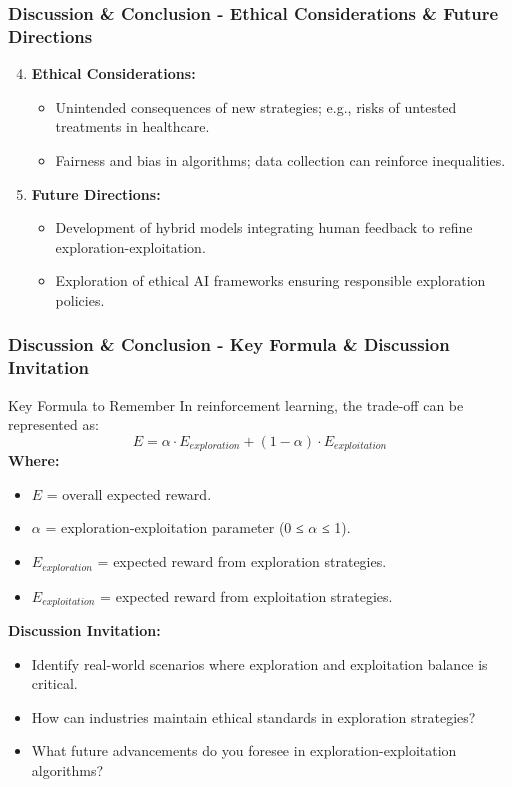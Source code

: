\documentclass[aspectratio=169]{beamer}
\begin{document}
\begin{frame}[fragile]
    \frametitle{Discussion \& Conclusion - Ethical Considerations \& Future Directions}
    \begin{enumerate}
        \setcounter{enumi}{3}
        \item \textbf{Ethical Considerations:}
        \begin{itemize}
            \item Unintended consequences of new strategies; e.g., risks of untested treatments in healthcare.
            \item Fairness and bias in algorithms; data collection can reinforce inequalities.
        \end{itemize}
        
        \item \textbf{Future Directions:}
        \begin{itemize}
            \item Development of hybrid models integrating human feedback to refine exploration-exploitation.
            \item Exploration of ethical AI frameworks ensuring responsible exploration policies.
        \end{itemize}
    \end{enumerate}
\end{frame}

\begin{frame}[fragile]
    \frametitle{Discussion \& Conclusion - Key Formula \& Discussion Invitation}
    \begin{block}{Key Formula to Remember}
        In reinforcement learning, the trade-off can be represented as: 
        \begin{equation}
            E = \alpha \cdot E_{exploration} + (1 - \alpha) \cdot E_{exploitation}
        \end{equation}
        \textbf{Where:}
        \begin{itemize}
            \item $E$ = overall expected reward.
            \item $\alpha$ = exploration-exploitation parameter (0 ≤ $\alpha$ ≤ 1).
            \item $E_{exploration}$ = expected reward from exploration strategies.
            \item $E_{exploitation}$ = expected reward from exploitation strategies.
        \end{itemize}
    \end{block}
    
    \textbf{Discussion Invitation:}
    \begin{itemize}
        \item Identify real-world scenarios where exploration and exploitation balance is critical.
        \item How can industries maintain ethical standards in exploration strategies?
        \item What future advancements do you foresee in exploration-exploitation algorithms?
    \end{itemize}
\end{frame}
\end{document}

